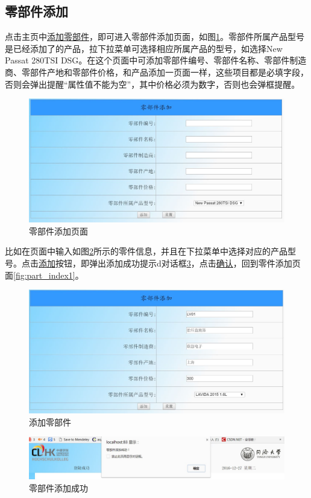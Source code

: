 \subsection{零部件添加}
点击主页中\underline{添加零部件}，即可进入零部件添加页面，如图\ref{fig:part_add_index}。零部件所属产品型号是已经添加了的产品，拉下拉菜单可选择相应所属产品的型号，如选择New Passat 280TSI DSG。在这个页面中可添加零部件编号、零部件名称、零部件制造商、零部件产地和零部件价格，和产品添加一页面一样，这些项目都是必填字段，否则会弹出提醒``属性值不能为空''，其中价格必须为数字，否则也会弹框提醒。
\begin{figure}[H]
\centering
\includegraphics[width=0.9\linewidth]{figure/part_add_index}
\caption{零部件添加页面}
\label{fig:part_add_index}
\end{figure}

比如在页面中输入如图\ref{fig:part_add_inf}所示的零件信息，并且在下拉菜单中选择对应的产品型号。点击\underline{添加}按钮，即弹出添加成功提示d对话框\ref{fig:par_add_success}，点击\underline{确认}，回到零件添加页面\ref{fig:part_index1}。

\begin{figure}[H]
\centering
\includegraphics[width=0.8\linewidth]{figure/part_add_inf}
\caption{添加零部件}
\label{fig:part_add_inf}
\end{figure}

\begin{figure}[H]
\centering
\includegraphics[width=0.9\linewidth]{figure/par_add_success}
\caption{零部件添加成功}
\label{fig:par_add_success}
\end{figure}

